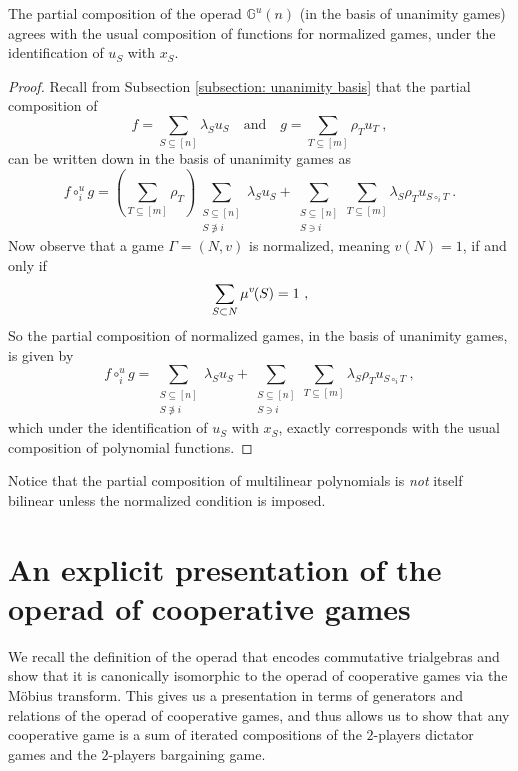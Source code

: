 \documentclass[a4paper,12pt]{amsart}
\begin{document}
\begin{proposition}\label{prop: composition of multilinear polynomials}
The partial composition of the operad $\mathbb{G}^{u}(n)$ (in the basis of unanimity games) agrees with the usual composition of functions for normalized games, under the identification of $u_S$ with $x_S$. 
\end{proposition}

\begin{proof}
Recall from Subsection \ref{subsection: unanimity basis} that the partial composition of 
\[
f = \sum_{S \subseteq [n]} \lambda_S u_S \quad \text{and} \quad g = \sum_{T \subseteq [m]} \rho_T u_T~,
\]
can be written down in the basis of unanimity games as 
\[
f \circ_i^{u} g = \left(\sum_{T \subseteq [m]} \rho_T\right)\sum_{\substack{S \subseteq [n] \\ S \not \ni i}} \lambda_S u_S + \sum_{\substack{S \subseteq [n] \\ S \ni i}} \sum_{T \subseteq [m]} \lambda_{S}\rho_T u_{S \circ_i T}~.
\]
Now observe that a game $\Gamma = (N, v)$ is normalized, meaning $v(N) = 1$, if and only if 
\[
\sum_{S \subset N} \mu^v \hspace{-1pt} (S) = 1~, 
\]
So the partial composition of normalized games, in the basis of unanimity games, is given by 
\[
f \circ_i^{u} g = \sum_{\substack{S \subseteq [n] \\ S \not \ni i}} \lambda_S u_S + \sum_{\substack{S \subseteq [n] \\ S \ni i}} \sum_{T \subseteq [m]} \lambda_{S}\rho_T u_{S \circ_i T}~, 
\]
which under the identification of $u_S$ with $x_S$, exactly corresponds with the usual composition of polynomial functions.
\end{proof}

\begin{remark}
Notice that the partial composition of multilinear polynomials is \textit{not} itself bilinear unless the normalized condition is imposed.
\end{remark}


\vspace{1.5pc}


\section{An explicit presentation of the operad of cooperative games}

\vspace{2pc}


We recall the definition of the operad that encodes commutative trialgebras and show that it is canonically isomorphic to the operad of cooperative games via the Möbius transform. This gives us a presentation in terms of generators and relations of the operad of cooperative games, and thus allows us to show that any cooperative game is a sum of iterated compositions of the $2$-players dictator games and the $2$-players bargaining game.
\end{document}
